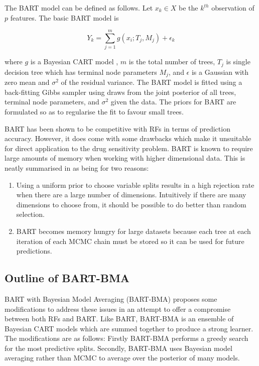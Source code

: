 \documentclass[journal]{IEEEtran}
\begin{document}
The BART model can be defined as follows. Let $x_k \in X$ be the $k^{th}$ observation of $p$ features. The basic BART model is

\begin{equation}
	Y_k = \sum_{j=1}^{m} g(x_i; T_j, M_j) + \epsilon_k
\end{equation}

where $g$ is a Bayesian CART model \cite{chipman1998bayesian}, $m$ is the total number of trees, $T_j$ is single decision tree which has terminal node parameters $M_j$, and $\epsilon$ is a Gaussian with zero mean and $\sigma^2$ of the residual variance. The BART model is fitted using a back-fitting Gibbs sampler using draws from the joint posterior of all trees, terminal node parameters, and $\sigma^2$ given the data. The priors for BART are formulated so as to regularise the fit to favour small trees.

BART has been shown to be competitive with RFs in terms of prediction accuracy. However, it does come with some drawbacks which make it unsuitable for direct application to the drug sensitivity problem. BART is known to require large amounts of memory when working with higher dimensional data. This is neatly summarised in \cite{hernandez2015bayesian} as being for two reasons:

\begin{enumerate}
	\item Using a uniform prior to choose variable splits results in a high rejection rate when there are a large number of dimensions. Intuitively if there are many dimensions to choose from, it should be possible to do better than random selection.
	\item BART becomes memory hungry for large datasets because each tree at each iteration of each MCMC chain must be stored so it can be used for future predictions. 
\end{enumerate}

\subsection{Outline of BART-BMA}
BART with Bayesian Model Averaging (BART-BMA) \cite{hernandez2015bayesian} proposes some modifications to address these issues in an attempt to offer a compromise between both RFs and BART. Like BART, BART-BMA is an ensemble of Bayesian CART models which are summed together to produce a strong learner. The modifications are as follows: Firstly BART-BMA performs a greedy search for the most predictive splits. Secondly, BART-BMA uses Bayesian model averaging rather than MCMC to average over the posterior of many models.
\end{document}
